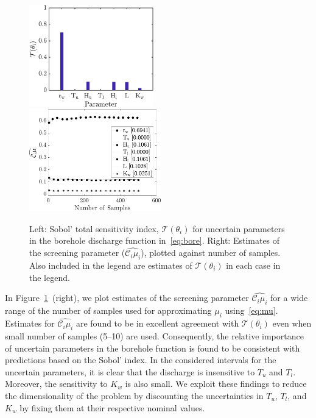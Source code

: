 \begin{figure}[htbp]
 \begin{center}
  \includegraphics[width=0.48\textwidth]{./Figures/sense_borehole}
  \includegraphics[width=0.51\textwidth]{./Figures/ub_conv_borehole}
\caption{
Left: Sobol' total sensitivity index, $\mathcal{T}(\theta_i)$ for uncertain parameters in the
borehole discharge function in~\eqref{eq:bore}. Right: 
Estimates of the screening parameter ($\widehat{\mathcal{C}_i\mu_i}$), plotted
against number of samples. Also included in the legend are estimates of $\mathcal{T}(\theta_i)$
in each case in the legend.}
\label{fig:sense_bore}
\end{center}
\end{figure}

In Figure~\ref{fig:sense_bore}~(right), we plot estimates of the screening parameter 
$\widehat{\mathcal{C}_i\mu_i}$ for a wide range of the number of 
samples used for approximating $\mu_i$ using~\eqref{eq:mu}.
Estimates for $\widehat{\mathcal{C}_i\mu_i}$ are found to be in excellent agreement
with $\mathcal{T}(\theta_i)$ even when small number of samples (5--10) are used. 
Consequently, the relative importance of uncertain 
parameters in the borehole function is found to be consistent 
with predictions based on the Sobol' index. 
In the considered intervals for the uncertain parameters, it is clear 
that the discharge is insensitive to $T_u$ and $T_l$. 
Moreover, the sensitivity to $K_w$ is also small. We exploit these findings to reduce
the dimensionality of the problem by 
discounting the uncertainties in $T_u$, $T_l$, and $K_w$ by fixing 
them at their respective nominal values. 

